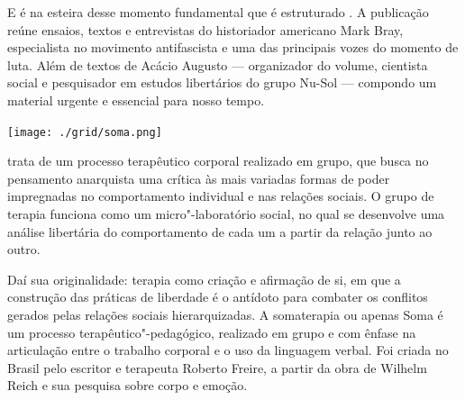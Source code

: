 E é na esteira desse momento fundamental que é estruturado {}. A publicação reúne ensaios, textos e entrevistas do historiador americano Mark Bray, especialista no movimento antifascista e uma das principais vozes do momento de luta. Além de textos de Acácio Augusto --- organizador do volume, cientista social e pesquisador em estudos libertários do grupo Nu-Sol --- compondo um material urgente e essencial para nosso tempo.

\vfill

\hspace*{-.4cm}\begin{minipage}[c]{.5\linewidth}
\small{
{}}
\end{minipage}

\pagebreak %

\begin{center}
\hspace*{.5cm}\texttt{[image: ./grid/soma.png]}
\end{center}

\hspace*{-7cm}\hrulefill\hspace*{-7cm}

\medskip

 trata de um processo terapêutico corporal realizado em grupo, que busca no pensamento anarquista uma crítica às mais variadas formas de poder impregnadas no comportamento individual e nas relações sociais. O grupo de terapia funciona como um micro"-laboratório social, no qual se desenvolve uma análise libertária do comportamento de cada um a partir da relação junto ao outro.

Daí sua originalidade: terapia como criação e afirmação de si, em que a construção das práticas de liberdade é o antídoto para combater os conflitos gerados pelas relações sociais hierarquizadas. A somaterapia ou apenas Soma é um processo terapêutico"-pedagógico, realizado em grupo e com ênfase na articulação entre o trabalho corporal e o uso da linguagem verbal. Foi criada no Brasil pelo escritor e terapeuta Roberto Freire, a partir da obra de Wilhelm Reich e sua pesquisa sobre corpo e emoção.

